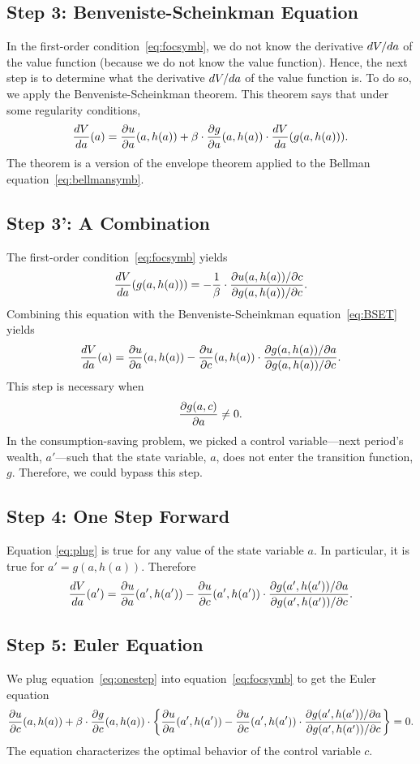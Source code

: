 \documentclass[letterpaper,12pt,leqno]{article}
\begin{document}
\subsection{Step 3: Benveniste-Scheinkman Equation}

In the first-order condition~\eqref{eq:focsymb}, we do not know  the derivative $d V/d a$ of the value function (because we do not know the value function). Hence, the next step is to determine what the derivative $d V/d a$ of the value function is. To do so, we apply the Benveniste-Scheinkman theorem. This theorem says that under some regularity conditions,
\begin{align}
\frac{d V}{d a}(a)=\frac{\partial  u}{\partial a}(a,h(a))+\beta\cdot \frac{\partial  g}{\partial a}(a,h(a))\cdot \frac{d V}{d a}(g(a,h(a))).\label{eq:BSET}
\end{align}
The theorem is a version of the envelope theorem applied to the Bellman equation~\eqref{eq:bellmansymb}.

\subsection{Step 3': A Combination}

The first-order condition~\eqref{eq:focsymb} yields
\begin{align}
\frac{d V}{d a}(g(a,h(a)))=-\frac{1}{\beta}\cdot \frac{\partial u(a,h(a))/\partial c}{\partial g(a,h(a))/\partial c}.
\end{align}
Combining this equation with the Benveniste-Scheinkman equation~\eqref{eq:BSET} yields
\begin{align}
\frac{d V}{d a}(a)=\frac{\partial u}{\partial a}(a,h(a))-\frac{\partial u}{\partial c}(a,h(a))\cdot \frac{\partial g(a,h(a))/\partial a}{\partial g(a,h(a))/\partial c}.\label{eq:plug}
\end{align}
This step is necessary when \[\frac{\partial g(a,c)}{\partial a}\neq 0.\] In the consumption-saving problem, we picked a control variable---next period's wealth, $a'$---such that the state variable, $a$, does not enter the transition function, $g$. Therefore, we could bypass this step.

\subsection{Step 4: One Step Forward}

Equation \eqref{eq:plug} is true for any value of the state variable $a$. In particular, it is true for $a'=g(a,h(a))$. Therefore
\begin{align}
\frac{d V}{d a}(a')=\frac{\partial u}{\partial a}(a',h(a'))-\frac{\partial u}{\partial c}(a',h(a'))\cdot \frac{\partial g(a',h(a'))/\partial a}{\partial g(a',h(a'))/\partial c}.\label{eq:onestep}
\end{align}

\subsection{Step 5: Euler Equation}

We plug equation~\eqref{eq:onestep} into equation~\eqref{eq:focsymb} to get the Euler equation
\begin{equation*}
\frac{\partial u}{\partial c}(a,h(a))+\beta \cdot \frac{\partial g}{\partial c}(a,h(a)) \cdot \left\lbrace \frac{\partial u}{\partial a}(a',h(a'))-\frac{\partial u}{\partial c}(a',h(a')) \cdot \frac{\partial g(a',h(a'))/\partial a}{\partial g(a',h(a'))/\partial c} \right\rbrace=0.
\end{equation*}
The equation characterizes the optimal behavior of the control variable $c$.
\end{document}
